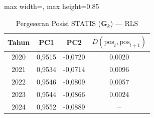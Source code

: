 \begin{table}[H]
\centering
\caption{Pergeseran Posisi STATIS ($\mathbf{G}_k$) --- RLS} \label{tab:app1jarak_statis_loading_rls}
\begin{adjustbox}{max width=\textwidth, max height=0.85\textheight}
\begin{tabular}{|c|c|c|c|}
\hline
\textbf{Tahun} & \textbf{PC1} & \textbf{PC2} & \textbf{$D(\text{pos}_t, \text{pos}_{t+1})$} \\
\hline
2020 & 0,9515 & -0,0720 & 0,0020 \\
2021 & 0,9534 & -0,0714 & 0,0096 \\
2022 & 0,9546 & -0,0809 & 0,0057 \\
2023 & 0,9544 & -0,0866 & 0,0024 \\
2024 & 0,9552 & -0,0889 & -- \\
\hline
\end{tabular}
\end{adjustbox}
\end{table}